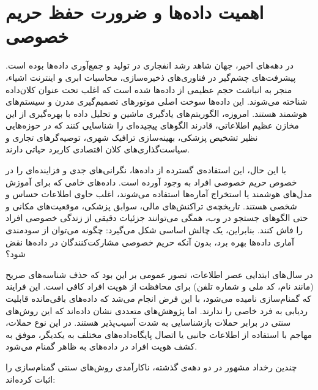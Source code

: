 \section{اهمیت داده‌ها و ضرورت حفظ حریم خصوصی}
\label{sec:intro:importance}

در دهه‌های اخیر، جهان شاهد رشد انفجاری در تولید و جمع‌آوری داده‌ها بوده است.
پیشرفت‌های چشم‌گیر در فناوری‌های ذخیره‌سازی، محاسبات ابری و اینترنت اشیاء، منجر به انباشت حجم عظیمی از داده‌ها شده است که اغلب تحت عنوان کلان‌داده شناخته می‌شوند.
این داده‌ها سوخت اصلی موتورهای تصمیم‌گیری مدرن و سیستم‌های هوشمند هستند.
امروزه، الگوریتم‌های یادگیری ماشین و تحلیل داده با بهره‌گیری از این مخازن عظیم اطلاعاتی، قادرند الگوهای پیچیده‌ای را شناسایی کنند که در حوزه‌هایی نظیر تشخیص پزشکی، بهینه‌سازی ترافیک شهری، توصیه‌گرهای تجاری و سیاست‌گذاری‌های کلان اقتصادی کاربرد حیاتی دارند.

با این حال، این استفاده‌ی گسترده از داده‌ها، نگرانی‌های جدی و فزاینده‌ای را در خصوص حریم خصوصی افراد به وجود آورده است.
داده‌های خامی که برای آموزش مدل‌های هوشمند یا استخراج آماره‌ها استفاده می‌شوند، اغلب حاوی اطلاعات حساس و شخصی هستند.
تاریخچه‌ی تراکنش‌های مالی، سوابق پزشکی، موقعیت‌های مکانی و حتی الگوهای جستجو در وب، همگی می‌توانند جزئیات دقیقی از زندگی خصوصی افراد را فاش کنند.
بنابراین، یک چالش اساسی شکل می‌گیرد: چگونه می‌توان از سودمندی آماری داده‌ها بهره برد، بدون آنکه حریم خصوصی مشارکت‌کنندگان در داده‌ها نقض شود؟

در سال‌های ابتدایی عصر اطلاعات، تصور عمومی بر این بود که حذف شناسه‌های صریح (مانند نام، کد ملی و شماره تلفن) برای محافظت از هویت افراد کافی است.
این فرایند که گمنام‌سازی  نامیده می‌شود، با این فرض انجام می‌شد که داده‌های باقی‌مانده قابلیت ردیابی به فرد خاصی را ندارند.
اما پژوهش‌های متعددی نشان داده‌اند که این روش‌های سنتی در برابر حملات بازشناسایی  به شدت آسیب‌پذیر هستند.
در این نوع حملات، مهاجم با استفاده از اطلاعات جانبی یا اتصال پایگاه‌داده‌های مختلف به یکدیگر، موفق به کشف هویت افراد در داده‌های به ظاهر گمنام می‌شود.

چندین رخداد مشهور در دو دهه‌ی گذشته، ناکارآمدی روش‌های سنتی گمنام‌سازی را اثبات کرده‌اند:

